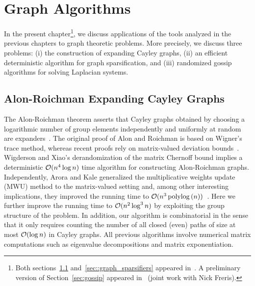 \chapter{Graph Algorithms}\label{chap:graph}
In the present chapter\footnote{Both sections~\ref{sec:AR_graphs} and~\ref{sec::graph_sparsifiers} appeared in~\cite{ICALP12}. A preliminary version of Section~\ref{sec:gossip} appeared in~\cite{CDC12} (joint work with Nick Freris).}, we discuss applications of the tools analyzed in the previous chapters to graph theoretic problems. More precisely, we discuss three problems: (i) the construction of expanding Cayley graphs, (ii) an efficient deterministic algorithm for graph sparsification, and (iii) randomized gossip algorithms for solving Laplacian systems.
%

%
\section{Alon-Roichman Expanding Cayley Graphs}\label{sec:AR_graphs}
%
The Alon-Roichman theorem asserts that Cayley graphs obtained by choosing a logarithmic number of group elements independently and uniformly at random are expanders~\cite{expander:AlonRoichman:orig}. The original proof of Alon and Roichman is based on Wigner's trace method, whereas recent proofs rely on matrix-valued deviation bounds~\cite{expander:AlonRoichman:RusLan}. Wigderson and Xiao's derandomization of the matrix Chernoff bound implies a deterministic $\mathcal{O}(n^4 \log n )$ time algorithm for constructing Alon-Roichman graphs. Independently, Arora and Kale generalized the multiplicative weights update (MWU) method to the matrix-valued setting and, among other interesting implications, they improved the running time to $\mathcal{O}(n^3\operatorname{polylog}\left(n\right))$~\cite{phdthesis:Kale:2008}. Here we further improve the running time to $\mathcal{O}(n^2 \log^3 n)$ by exploiting the group structure of the problem. In addition, our algorithm is combinatorial in the sense that it only requires counting the number of all closed (even) paths of size at most $\mathcal{O}(\log n)$ in Cayley graphs. All previous algorithms involve numerical matrix computations such as eigenvalue decompositions and matrix exponentiation.
%

